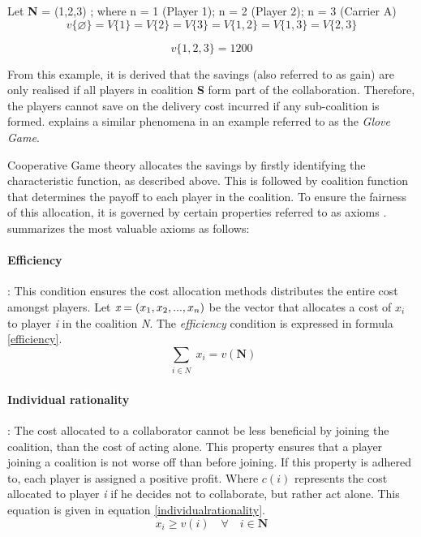 Let \textbf{N} = (1,2,3) ; where n = 1 (Player 1); n = 2 (Player 2); n = 3 (Carrier A)
\begin{equation}
\label{exNoCollab}
    v\{\varnothing\} = V\{1\} = V\{2\} = V\{3\} = V\{1,2\} = V\{1,3\} = V\{2,3\}
\end{equation}

\begin{equation}
\label{exAllCollab}
    v\{1,2,3\} = 1200
\end{equation}

From this example, it is derived that the savings (also referred to as gain) are only realised if all players in coalition \textbf{S} form part of the collaboration. Therefore, the players cannot save on the delivery cost incurred if any sub-coalition is formed. \citet{branzei2008models} explains a similar phenomena in an example referred to as the \textit{Glove Game}.\par

Cooperative Game theory allocates the savings by firstly identifying the characteristic function, as described above. This is followed by coalition function that determines the payoff to each player in the coalition. To ensure the fairness of this allocation, it is governed by certain properties referred to as axioms \citep{hadzic2013cooperative}. \citet{defryn2013gain} summarizes the most valuable axioms as follows:

\paragraph{Efficiency}: This condition ensures the cost allocation methods distributes the entire cost amongst players. Let \(\emph{x} = (x_1, x_2, ..., x_n)\) be the vector that allocates a cost of \(x_i\) to player \textit{i} in the coalition \emph{N}. The \textit{efficiency} condition is expressed in formula \ref{efficiency}.
\begin{equation}
\label{efficiency}
\sum_{\substack{i\in N}} x_\textit{i} = \textit{v} (\textbf{N})
\end{equation}

\paragraph{Individual rationality}: The cost allocated to a collaborator cannot be less beneficial by joining the coalition, than the cost of acting alone. This property ensures that a player joining a coalition is not worse off than before joining. If this property is adhered to, each player is assigned a positive profit. Where \( c({i})\) represents the cost allocated to player \textit{i} if he decides not to collaborate, but rather act alone. This equation is given in equation \ref{individualrationality}.
\begin{equation}
\label{individualrationality}
x_i \geq \textit{v}(i) \quad \forall \quad i \in \textbf{N}
\end{equation}


